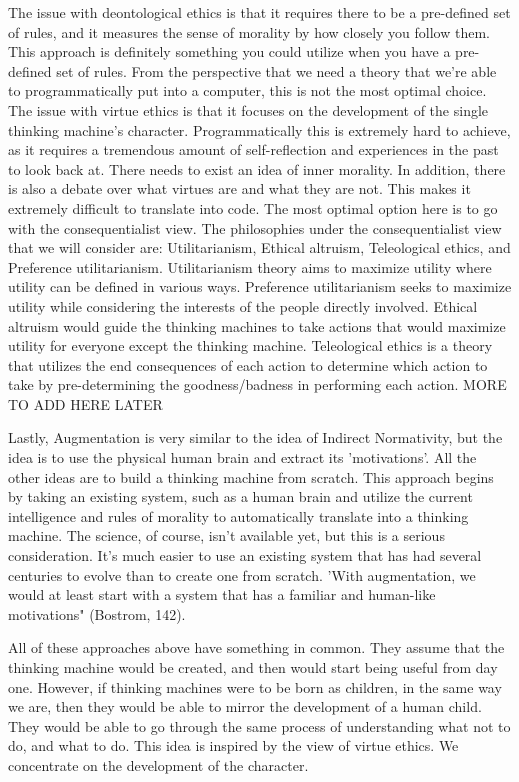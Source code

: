 \documentclass[11pt, oneside]{article}
\begin{document}
\par The issue with deontological ethics is that it requires there to be a pre-defined set of rules, and it measures the sense of morality by how closely you follow them. This approach is definitely something you could utilize when you have a pre-defined set of rules. From the perspective that we need a theory that we're able to programmatically put into a computer, this is not the most optimal choice. The issue with virtue ethics is that it focuses on the development of the single thinking machine's character. Programmatically this is extremely hard to achieve, as it requires a tremendous amount of self-reflection and experiences in the past to look back at. There needs to exist an idea of inner morality. In addition, there is also a debate over what virtues are and what they are not. This makes it extremely difficult to translate into code. The most optimal option here is to go with the consequentialist view. The philosophies under the consequentialist view that we will consider are: Utilitarianism, Ethical altruism, Teleological ethics, and Preference utilitarianism. Utilitarianism theory aims to maximize utility where utility can be defined in various ways. Preference utilitarianism seeks to maximize utility while considering the interests of the people directly involved. Ethical altruism would guide the thinking machines to take actions that would maximize utility for everyone except the thinking machine. Teleological ethics is a theory that utilizes the end consequences of each action to determine which action to take by pre-determining the goodness/badness in performing each action. {MORE TO ADD HERE LATER}
 
\par Lastly, Augmentation is very similar to the idea of Indirect Normativity, but the idea is to use the physical human brain and extract its 'motivations'. All the other ideas are to build a thinking machine from scratch. This approach begins by taking an existing system, such as a human brain and utilize the current intelligence and rules of morality to automatically translate into a thinking machine. The science, of course, isn't available yet, but this is a serious consideration. It's much easier to use an existing system that has had several centuries to evolve than to create one from scratch. 'With augmentation, we would at least start with a system that has a familiar and human-like motivations" (Bostrom, 142).
 
\par All of these approaches above have something in common. They assume that the thinking machine would be created, and then would start being useful from day one. However, if thinking machines were to be born as children, in the same way we are, then they would be able to mirror the development of a human child. They would be able to go through the same process of understanding what not to do, and what to do. This idea is inspired by the view of virtue ethics. We concentrate on the development of the character.
 
\end{document}
